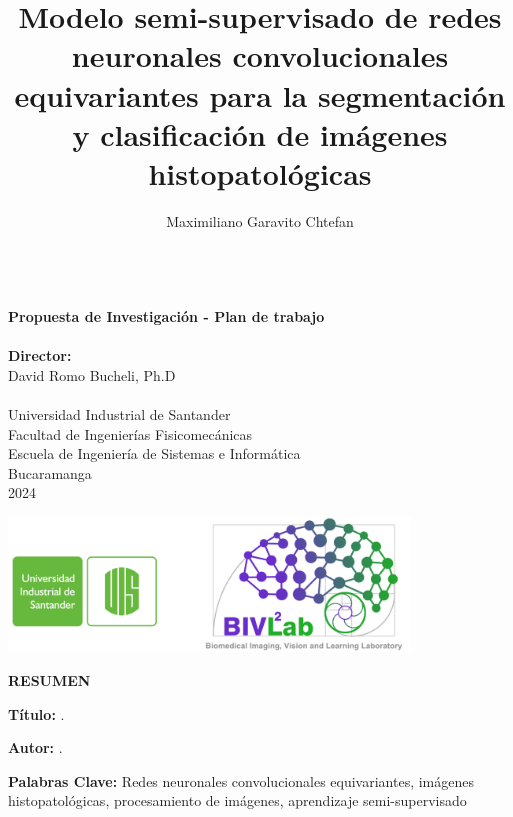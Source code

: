 \documentclass[12pt,letterpaper,final, openany]{scrbook}
\author{Maximiliano Garavito Chtefan}\let\Author\@author
\title{Modelo semi-supervisado de redes neuronales convolucionales equivariantes para la segmentación y clasificación de imágenes histopatológicas}\let\Title\@title
\begin{document}
\begin{center}
\vspace*{0.2cm}
\Large\textbf{\Title }\\[2cm]
\large\textbf{Propuesta de Investigación - Plan de trabajo}\\[2cm]
\Large\Author\\[2cm]
\large\textbf{Director:}\\
\large{David Romo Bucheli, Ph.D}\\[0.5cm]
\\[2cm]
\normalsize Universidad Industrial de Santander\\
Facultad de Ingenierías Fisicomecánicas\\
Escuela de Ingeniería de Sistemas e Informática\\
Bucaramanga\\
2024\\[1.5cm]
\begin{center}
\includegraphics[width=0.8\textwidth]{logos.png}
\end{center}
\end{center}


\setcounter{tocdepth}{2}
\tableofcontents
\newpage
{}
\setcounter{page}{1}
\begin{center}
\Large\textbf{RESUMEN}\\[20pt]
\end{center}
\textbf{Título:} \Title.\footnotemark[1]

\textbf{Autor:} \Author.\footnotemark[2] 

\textbf{Palabras Clave:} Redes neuronales convolucionales equivariantes, imágenes histopatológicas, procesamiento de imágenes, aprendizaje semi-supervisado
 
\end{document}
